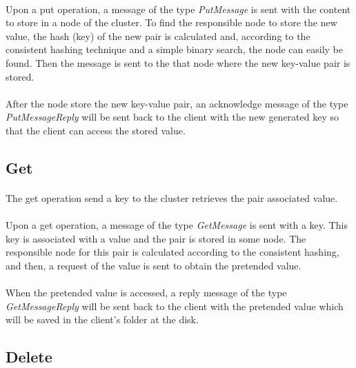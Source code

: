 \documentclass{report}
\begin{document}
					\paragraph{} Upon a put operation, a message of the type \emph{PutMessage}
					is sent with the content to store in a node of the cluster. To find the
					responsible node to store the new value, the hash (key) of the new pair is 
					calculated and, according to the consistent hashing technique and a 
					simple binary search, the node can easily be found. Then the message is
					sent to the that node where the new key-value pair is stored.

					\paragraph{} After the node store the new key-value pair, an acknowledge
					message of the type \emph{PutMessageReply} will be sent back to the client
					with the new generated key so that the client can access the stored value.

				\subsection{Get}
					\paragraph{} The get operation send a key to the cluster retrieves
					the pair associated value.

					\paragraph{} Upon a get operation, a message of the type \emph{GetMessage}
					is sent with a key. This key is associated with a value and the pair is
					stored in some node. The responsible node for this pair is calculated
					according to the consistent hashing, and then, a request of the value
					is sent to obtain the pretended value.

					\paragraph{} When the pretended value is accessed, a reply message of the type
					\emph{GetMessageReply} will be sent back to the client with the pretended 
					value which will be saved in the client's folder at the disk.

				\subsection{Delete}
\end{document}
